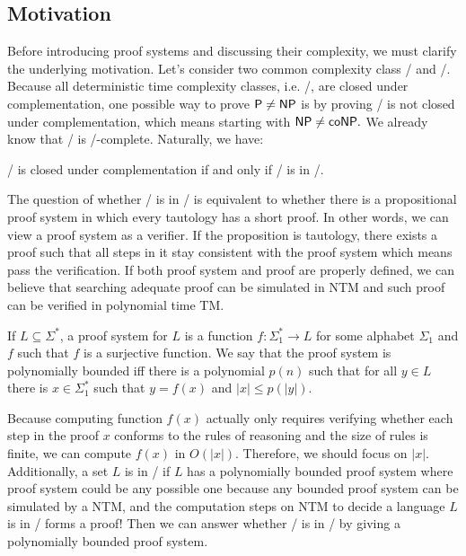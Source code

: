 \documentclass{article}
\begin{document}
\else
\fi
\subsection{Motivation}
Before introducing proof systems and discussing their complexity, we must clarify the underlying motivation. Let's consider two common complexity class \np/ and \conp/. Because all deterministic time complexity classes, i.e. \p/, are closed under complementation, one possible way to prove $\p/ \neq \np/$ is by proving \np/ is not closed under complementation, which means starting with $\np/ \neq \conp/.$ We already know that \TAUT/ is \conp/-complete. Naturally, we have:

\begin{Theorem}
  \begin{theorem}
    \np/ is closed under complementation if and only if \TAUT/ is in \np/.
  \end{theorem}
\end{Theorem}

The question of whether \TAUT/ is in \np/ is equivalent to whether there is a propositional proof system in which every tautology has a short proof. In other words, we can view a proof system as a verifier. If the proposition is tautology, there exists a proof such that all steps in it stay consistent with the proof system which means pass the verification. If both proof system and proof are properly defined, we can believe that searching adequate proof can be simulated in NTM and such proof can be verified in polynomial time TM.

\begin{Define}
  \begin{define}
    If $L \subseteq \Sigma^*$, a proof system for $L$ is a function $f: \Sigma_1^* \rightarrow L$ for some alphabet $\Sigma_1$ and $f$ such that $f$ is a surjective function. We say that the proof system is polynomially bounded iff there is a polynomial $p(n)$ such that for all $y \in L$ there is $x \in \Sigma_1^*$ such that $y = f(x)$ and $|x| \leq p(|y|).$
  \end{define}
\end{Define}

Because computing function $f(x)$ actually only requires verifying whether each step in the proof $x$ conforms to the rules of reasoning and the size of rules is finite, we can compute $f(x)$ in $O(|x|).$ Therefore, we should focus on $|x|.$  Additionally, a set $L$ is in \np/ if $L$ has a polynomially bounded proof system where proof system could be any possible one because any bounded proof system can be simulated by a NTM, and the computation steps on NTM to decide a language $L$ is in \np/ forms a proof! Then we can answer whether \TAUT/ is in \np/ by giving a polynomially bounded proof system.
\end{document}

